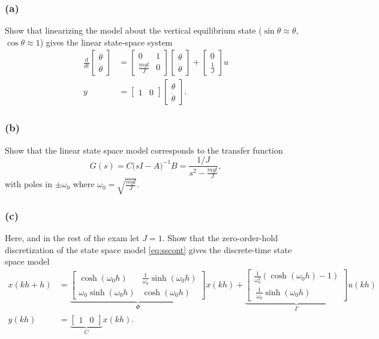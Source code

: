 \documentclass[letterpaper,12pt]{article}
\newcommand{\bbm}{\begin{bmatrix}}
\newcommand{\ebm}{\end{bmatrix}}
\begin{document}
\subsubsection*{(a)}
Show that linearizing the model about the vertical equilibrium state ($\sin\theta \approx \theta$, $\cos\theta \approx 1$) gives the linear state-space system
\begin{equation}
\begin{aligned}
\frac{d}{dt}  \bbm \theta\\\dot{\theta} \ebm &= \bbm 0 & 1\\ \frac{mgl}{J} & 0\ebm \bbm \theta\\\dot{\theta} \ebm + \bbm 0\\\frac{1}{J} \ebm u\\
y &= \bbm 1 & 0 \ebm \bbm \theta\\\dot{\theta} \ebm.
\end{aligned}
\label{eq:sscont}
\end{equation}

\subsubsection*{(b)}
Show that the linear state space model corresponds to the transfer function 
\begin{equation}
G(s) = C \big( sI- A\big)^{-1} B = \frac{ 1/J }{s^2 - \frac{mgl}{J}},
\end{equation}
with poles in \(\pm \omega_0\) where \(\omega_0 = \sqrt{\frac{mgl}{J}}\).


\subsubsection*{(c)}
Here, and in the rest of the exam let $J=1$. Show that the zero-order-hold discretization of the state space model \eqref{eq:sscont} gives the discrete-time state space model
\begin{equation}
\begin{aligned}
x(kh+h) &= \underbrace{\bbm \cosh(\omega_0h) & \frac{1}{\omega_0}\sinh(\omega_0h)\\
                            \omega_0\sinh(\omega_0h) & \cosh(\omega_0h) \ebm}_{\Phi} x(kh) 
       + \underbrace{\bbm \frac{1}{\omega_0^2}(\cosh(\omega_0h)-1)\\ \
                               \frac{1}{\omega_0}\sinh(\omega_0h) \ebm}_{\Gamma} u(kh)\\
y(kh) &= \underbrace{\bbm 1 & 0 \ebm}_{C} x(kh).
\end{aligned}
\end{equation}
\end{document}
